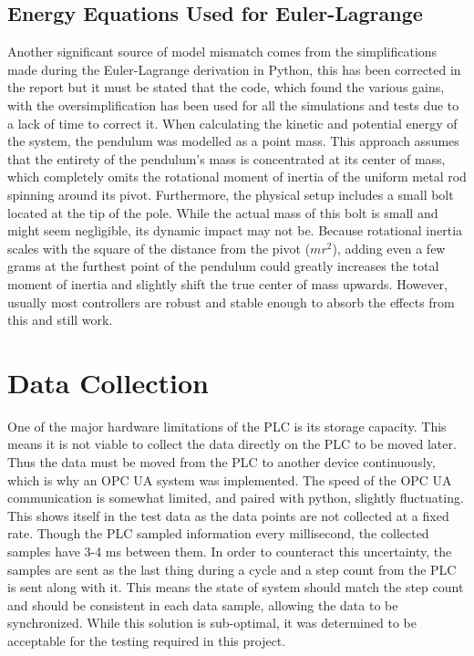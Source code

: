\subsection{Energy Equations Used for Euler-Lagrange}
Another significant source of model mismatch comes from the simplifications made during the Euler-Lagrange derivation in Python, this has been corrected in the report but it must be stated that the code, which found the various gains, with the oversimplification has been used for all the simulations and tests due to a lack of time to correct it. When calculating the kinetic and potential energy of the system, the pendulum was modelled as a point mass. This approach assumes that the entirety of the pendulum's mass is concentrated at its center of mass, which completely omits the rotational moment of inertia of the uniform metal rod spinning around its pivot. Furthermore, the physical setup includes a small bolt located at the tip of the pole. While the actual mass of this bolt is small and might seem negligible, its dynamic impact may not be. Because rotational inertia scales with the square of the distance from the pivot ($mr^2$), adding even a few grams at the furthest point of the pendulum could greatly increases the total moment of inertia and slightly shift the true center of mass upwards. However, usually most controllers are robust and stable enough to absorb the effects from this and still work.

\section{Data Collection} \label{sec:dataCollectionDiscussion}
One of the major hardware limitations of the PLC is its storage capacity. This means it is not viable to collect the data directly on the PLC to be moved later. Thus the data must be moved from the PLC to another device continuously, which is why an OPC UA system was implemented. The speed of the OPC UA communication is somewhat limited, and paired with python, slightly fluctuating. This shows itself in the test data as the data points are not collected at a fixed rate. Though the PLC sampled information every millisecond, the collected samples have 3-4 ms between them. In order to counteract this uncertainty, the samples are sent as the last thing during a cycle and a step count from the PLC is sent along with it. This means the state of system should match the step count and should be consistent in each data sample, allowing the data to be synchronized. While this solution is sub-optimal, it was determined to be acceptable for the testing required in this project.


